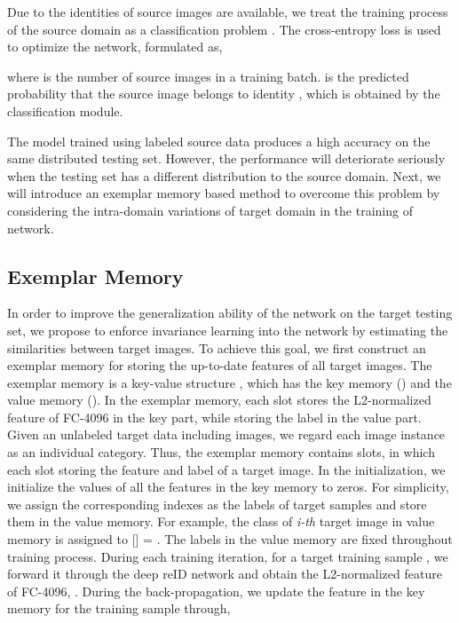 \documentclass[10pt,twocolumn,letterpaper]{article}
\begin{document}
Due to the identities of source images are available, we treat the training process of the source domain as a classification problem \cite{zheng2016personsurvery}. The cross-entropy loss is used to optimize the network, formulated as,

where  is the number of source images in a training batch.  is the predicted probability that the source image  belongs to identity , which is obtained by the classification module.

The model trained using labeled source data produces a high accuracy on the same distributed testing set. However, the performance will deteriorate seriously when the testing set has a different distribution to the source domain. Next, we will introduce an exemplar memory based method to overcome this problem by considering the intra-domain variations of target domain in the training of network. 


\subsection{Exemplar Memory}

In order to improve the generalization ability of the network on the target testing set, we propose to enforce invariance learning into the network by estimating the similarities between target images. 
To achieve this goal, we first construct an exemplar memory for storing the up-to-date features of all target images. The exemplar memory is a key-value structure \cite{xiao2017joint}, which has the key memory () and the value memory (). 
In the exemplar memory, each slot stores the L2-normalized feature of FC-4096 in the key part, while storing the label in the value part. 
Given an unlabeled target data including  images, we regard each image instance as an individual category. Thus, the exemplar memory contains  slots, in which each slot storing the feature and label of a target image. 
In the initialization, we initialize the values of all the features in the key memory to zeros. 
For simplicity, we assign the corresponding indexes as the labels of target samples and store them in the value memory. For example, the class of \emph{i-th} target image in value memory is assigned to [] = . 
The labels in the value memory are fixed throughout training process. 
During each training iteration, for a target training sample , we forward it through the deep reID network and obtain the L2-normalized feature of FC-4096, . 
During the back-propagation, we update the feature in the key memory for the training sample  through,
\end{document}
